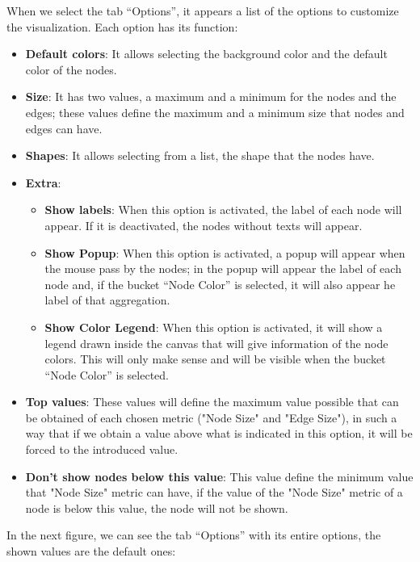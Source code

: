 \documentclass[a4paper, 12pt]{book}
\begin{document}
When we select the tab “Options”, it appears a list of the options to customize the visualization. Each option has its function: 

\begin{itemize}
\item \textbf{Default colors}: It allows selecting the background color and the default color of the nodes.
\item \textbf{Size}: It has two values, a maximum and a minimum for the nodes and the edges; these values define the maximum and a minimum size that nodes and edges can have.
\item \textbf{Shapes}: It allows selecting from a list, the shape that the nodes have.
\item \textbf{Extra}: 
\begin{itemize}
\item \textbf{Show labels}: When this option is activated, the label of each node will appear. If it is deactivated, the nodes without texts will appear.
\item \textbf{Show Popup}: When this option is activated, a popup will appear when the mouse pass by the nodes; in the popup will appear the label of each node and, if the bucket “Node Color” is selected, it will also appear he label of that aggregation.
\item \textbf{Show Color Legend}: When this option is activated, it will show a legend drawn inside the canvas that will give information of the node colors. This will only make sense and will be visible when the bucket “Node Color” is selected. 
\end{itemize}
\item \textbf{Top values}: These values will define the maximum value possible that can be obtained of each chosen metric ("Node Size" and "Edge Size"), in such a way that if we obtain a value above what is indicated in this option, it will be forced to the introduced value.
\item \textbf{Don't show nodes below this value}: This value define the minimum value that "Node Size" metric can have, if the value of the "Node Size" metric of a node is below this value, the node will not be shown.
\end{itemize}

In the next figure, we can see the tab “Options” with its entire options, the shown values are the default ones:
\end{document}
